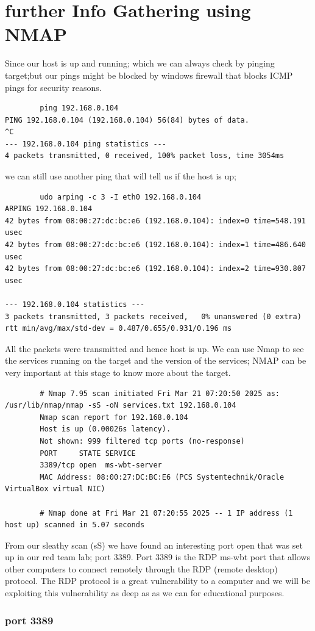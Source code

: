 \documentclass[a4paper,12pt]{article}
\begin{document}
\newpage{}
\section{further Info Gathering using NMAP}
Since our host is up and running; which we can always check by pinging target;but our pings might be blocked by windows firewall
that blocks ICMP pings for security reasons.
\begin{verbatim}
        ping 192.168.0.104
PING 192.168.0.104 (192.168.0.104) 56(84) bytes of data.
^C
--- 192.168.0.104 ping statistics ---
4 packets transmitted, 0 received, 100% packet loss, time 3054ms
\end{verbatim}
we can still use another ping that will tell us if the host is up;
\begin{verbatim}
        udo arping -c 3 -I eth0 192.168.0.104
ARPING 192.168.0.104
42 bytes from 08:00:27:dc:bc:e6 (192.168.0.104): index=0 time=548.191 usec
42 bytes from 08:00:27:dc:bc:e6 (192.168.0.104): index=1 time=486.640 usec
42 bytes from 08:00:27:dc:bc:e6 (192.168.0.104): index=2 time=930.807 usec

--- 192.168.0.104 statistics ---
3 packets transmitted, 3 packets received,   0% unanswered (0 extra)
rtt min/avg/max/std-dev = 0.487/0.655/0.931/0.196 ms

\end{verbatim}
All the packets were transmitted and hence host is up.
We can use Nmap to see the services running on the target and the version of the services; NMAP can be very important at this stage 
to know more about the target.
\begin{verbatim}
        # Nmap 7.95 scan initiated Fri Mar 21 07:20:50 2025 as: /usr/lib/nmap/nmap -sS -oN services.txt 192.168.0.104
        Nmap scan report for 192.168.0.104
        Host is up (0.00026s latency).
        Not shown: 999 filtered tcp ports (no-response)
        PORT     STATE SERVICE
        3389/tcp open  ms-wbt-server
        MAC Address: 08:00:27:DC:BC:E6 (PCS Systemtechnik/Oracle VirtualBox virtual NIC)
        
        # Nmap done at Fri Mar 21 07:20:55 2025 -- 1 IP address (1 host up) scanned in 5.07 seconds      
\end{verbatim}
From our sleathy scan (sS) we have found an interesting port open that was set up in our red team lab; port 3389.
Port 3389 is the RDP ms-wbt port that allows other computers to connect remotely through the RDP (remote desktop) protocol.
The RDP protocol is a great vulnerability to a computer and we will be exploiting this vulnerability as deep as as we can for
educational purposes.
\subsubsection{port 3389}
\end{document}
